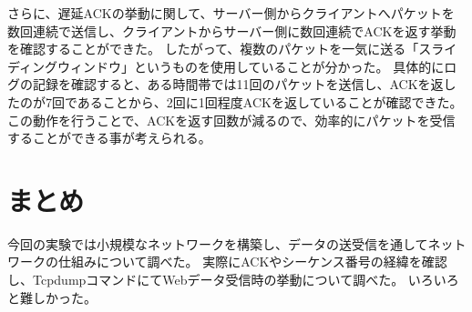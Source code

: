 \documentclass[twocolumn]{jsarticle}
\begin{document}
さらに、遅延ACKの挙動に関して、サーバー側からクライアントへパケットを数回連続で送信し、クライアントからサーバー側に数回連続でACKを返す挙動を確認することができた。
したがって、複数のパケットを一気に送る「スライディングウィンドウ」というものを使用していることが分かった。
具体的にログの記録を確認すると、ある時間帯では11回のパケットを送信し、ACKを返したのが7回であることから、2回に1回程度ACKを返していることが確認できた。
この動作を行うことで、ACKを返す回数が減るので、効率的にパケットを受信することができる事が考えられる。


\section{まとめ}
今回の実験では小規模なネットワークを構築し、データの送受信を通してネットワークの仕組みについて調べた。
実際にACKやシーケンス番号の経緯を確認し、TcpdumpコマンドにてWebデータ受信時の挙動について調べた。
いろいろと難しかった。
\end{document}
